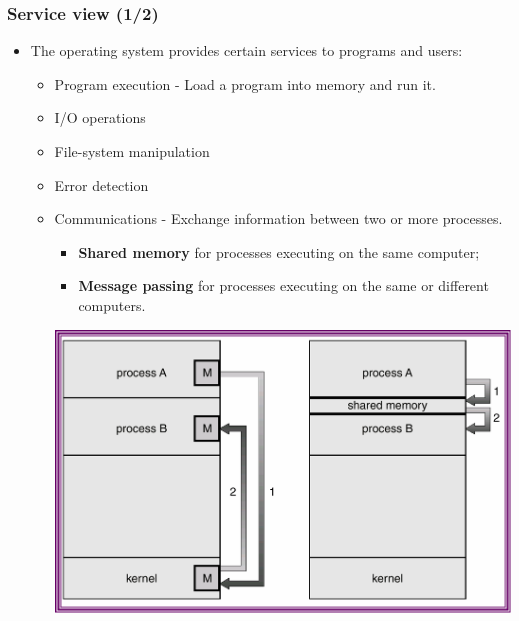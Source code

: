\documentclass[CJKutf8,xcolor=pdftex,dvipsnames,table]{beamer}
\begin{document}
\begin{CJK*}{UTF8}{song}
  \begin{frame}
    \frametitle{Service view (1/2)} \pause
    \begin{itemize}
    \item{The operating system provides certain services to programs and users:} \pause
      \begin{itemize}
      \item{Program execution \pause - Load a program into memory and run it.} \pause
      \item{I/O operations} \pause
      \item{File-system manipulation} \pause
      \item{Error detection} \pause
      \item{Communications \pause - Exchange information between two or more processes.}\\ \pause
        \begin{minipage}[c]{0.4\textwidth}
          \begin{itemize}
          \item{\textbf{Shared memory} for processes executing on the same computer;} \pause
          \item{\textbf{Message passing} for processes executing on the same or different computers.} \pause
          \end{itemize}
        \end{minipage}%
        \begin{minipage}[c]{0.6\textwidth}
          \includegraphics[scale=0.35]{v6f3-5}
        \end{minipage}
      \end{itemize}
    \end{itemize}
  \end{frame}


\end{CJK*}
\end{document}

